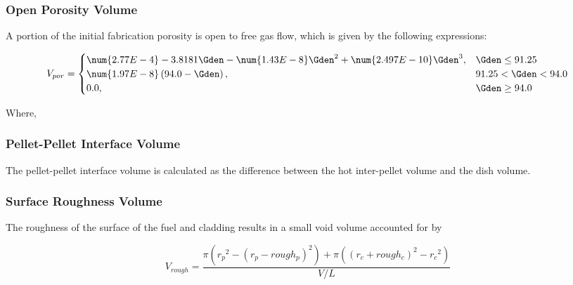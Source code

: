 \subsubsection{Open Porosity Volume} \label{section:open-porosity-volume}

A portion of the initial fabrication porosity is open to free gas flow, which is given by the
following expressions:

\begin{equation}
    V_{por} = 
    \begin{cases}
        \num{2.77E-4}-3.8181\Gden-\num{1.43E-8}\Gden^{2}+\num{2.497E-10}\Gden^{3}, & \Gden \leq 91.25     \\
        \num{1.97E-8}\left(94.0-\Gden\right),                                              & 91.25 < \Gden < 94.0 \\
        0.0 ,                                                                                 & \Gden \geq 94.0
    \end{cases}
\end{equation}

Where,


\subsubsection{Pellet-Pellet Interface Volume} \label{section:pellet-pellet-interface-volume}

The pellet-pellet interface volume is calculated as the difference between the hot inter-pellet
volume and the dish volume.

\subsubsection{Surface Roughness Volume} \label{section:surface-roughness-volume}

The roughness of the surface of the fuel and cladding results in a small void volume accounted for
by

\begin{equation}
    \label{eq:surface_roughness_volume}
    V_{rough} = \frac{\pi\left( {r_{p}}^{2} - \left( r_{p} - rough_{p} \right)^{2} \right) + \pi\left( \left( r_{c} + rough_{c} \right)^{2} - {r_{c}}^{2} \right)}{V/L}
\end{equation}

